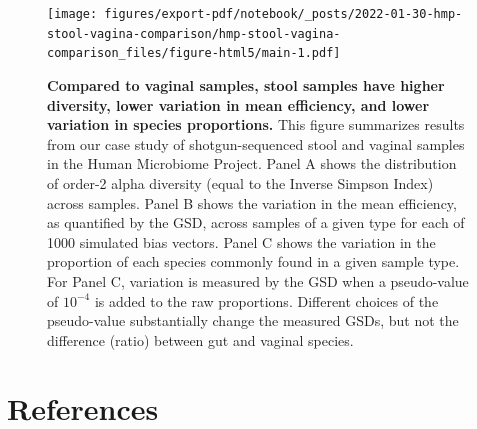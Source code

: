 \documentclass[
]{article}
\begin{document}
\begin{figure}
\centering
\texttt{[image: figures/export-pdf/notebook/\_posts/2022-01-30-hmp-stool-vagina-comparison/hmp-stool-vagina-comparison\_files/figure-html5/main-1.pdf]}
\caption{\label{fig:gut}\textbf{Compared to vaginal samples, stool samples have higher diversity, lower variation in mean efficiency, and lower variation in species proportions.} This figure summarizes results from our case study of shotgun-sequenced stool and vaginal samples in the Human Microbiome Project. Panel A shows the distribution of order-2 alpha diversity (equal to the Inverse Simpson Index) across samples. Panel B shows the variation in the mean efficiency, as quantified by the GSD, across samples of a given type for each of 1000 simulated bias vectors. Panel C shows the variation in the proportion of each species commonly found in a given sample type. For Panel C, variation is measured by the GSD when a pseudo-value of \(10^{-4}\) is added to the raw proportions. Different choices of the pseudo-value substantially change the measured GSDs, but not the difference (ratio) between gut and vaginal species.}
\end{figure}



\clearpage

\hypertarget{references}{%
\section*{References}\label{references}}
\end{document}
